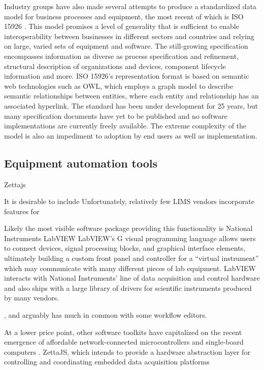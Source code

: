 Industry groups have also made several attempts to produce a
standardized data model for business processes and equipment, the
most recent of which is ISO 15926 \cite{West2009}. This model promises
a level of generality that is sufficient to enable interoperability
between businesses in different sectors and countries and relying on
large, varied sets of equipment and software. The still-growing
specification encompasses information as diverse as process
specification and refinement, structural description of organizations
and devices, component lifecycle information and more. ISO 15926's
representation format is based on semantic web technologies such as OWL, which
employs a graph model to describe semantic relationships between
entities, where each entity and relationship has an associated
hyperlink. The standard has been under development for 25 years, but
many specification documents have yet to be published and no software
implementations are currently freely available. The extreme complexity
of the model is also an impediment to adoption by end users as well as
implementation.

\subsection{Equipment automation tools}

Zettajs

It is desirable to include
Unfortunately, relatively few LIMS vendors incorporate features for

Likely the most visible software package providing this functionality
is National Instruments LabVIEW \cite{ELLIOTT2007}
LabVIEW's G visual programming language allows users to connect
devices, signal processing blocks, and graphical interface elements,
ultimately building a custom front panel and controller for a
``virtual instrument'' which may communicate with many different
pieces of lab equipment. LabVIEW interacts with National Instruments'
line of data acquisition and control hardware and also ships with a
large library of drivers for scientific instruments produced by many
vendors.

, and arguably has much in common
with some workflow editors.

At a lower price point, other software toolkits have capitalized on
the recent emergence of affordable network-connected microcontrollers
and single-board computers .
ZettaJS, which intends to provide a hardware abstraction layer for
controlling and coordinating embedded data acquisition platforms



